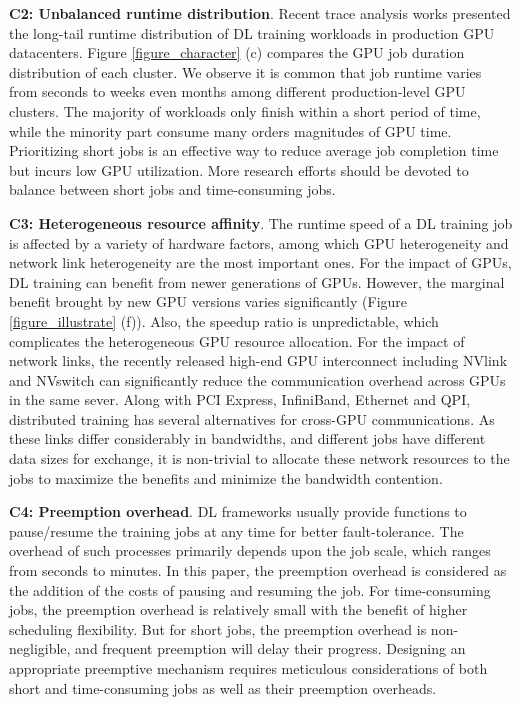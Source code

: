 \textbf{C2: Unbalanced runtime distribution}. Recent trace analysis works \cite{Philly, Helios, AliPAI, MLaaS} presented the long-tail runtime distribution of DL training workloads in production GPU datacenters. Figure \ref{figure_character} (c) compares the GPU job duration distribution of each cluster. We observe it is common that job runtime varies from seconds to weeks even months among different production-level GPU clusters. The majority of workloads only finish within a short period of time, while the minority part consume many orders magnitudes of GPU time. Prioritizing short jobs is an effective way to reduce average job completion time but incurs low GPU utilization. More research efforts should be devoted to balance between short jobs and time-consuming jobs.

\textbf{C3: Heterogeneous resource affinity}. The runtime speed of a DL training job is affected by a variety of hardware factors, among which GPU heterogeneity and network link heterogeneity are the most important ones. For the impact of GPUs, DL training can benefit from newer generations of GPUs. However, the marginal benefit brought by new GPU versions varies significantly (Figure \ref{figure_illustrate} (f)). Also, the speedup ratio is unpredictable, which complicates the heterogeneous GPU resource allocation. For the impact of network links, the recently released high-end GPU interconnect including NVlink and NVswitch can significantly reduce the communication overhead across GPUs in the same sever. Along with PCI Express, InfiniBand, Ethernet and QPI, distributed training has several alternatives for cross-GPU communications. As these links differ considerably in bandwidths, and different jobs have different data sizes for exchange, it is non-trivial to allocate these network resources to the jobs to maximize the benefits and minimize the bandwidth contention.


\textbf{C4: Preemption overhead}. DL frameworks usually provide functions to pause/resume the training jobs at any time for better fault-tolerance. The overhead of such processes primarily depends upon the job scale, which ranges from seconds to minutes. In this paper, the preemption overhead is considered as the addition of the costs of pausing and resuming the job. For time-consuming jobs, the preemption overhead is relatively small with the benefit of higher scheduling flexibility. But for short jobs, the preemption overhead is non-negligible, and frequent preemption will delay their progress. Designing an appropriate preemptive mechanism requires meticulous considerations of both short and time-consuming jobs as well as their preemption overheads.

